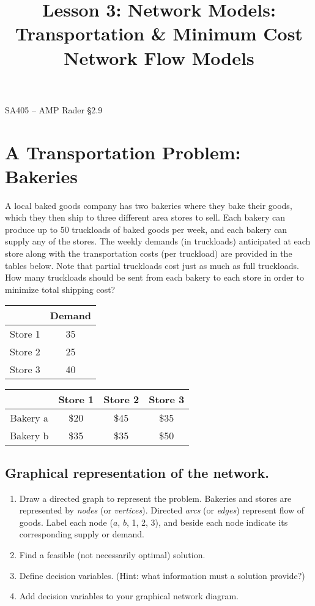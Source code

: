 \documentclass[11pt]{article}
\makeatletter
\theoremstyle{definition}
\renewcommand{\maketitle}{
  \noindent SA405 -- AMP \hfill Rader \S 2.9 \\

  \begin{center}\Large{\textbf{\@title}}\end{center}
}
\makeatother
\begin{document}
  
\title{Lesson 3: Network Models: Transportation \& Minimum Cost Network Flow Models}


\maketitle
\bigskip
\vspace{-1cm}

\section{A Transportation Problem:  Bakeries}
A local baked goods company has two bakeries where they bake their goods, which they then ship to three different area stores to sell.  Each bakery can produce up to 50 truckloads of baked goods per week, and each bakery can supply any of the stores.  The weekly demands (in truckloads) anticipated at each store along with the transportation costs (per truckload) are provided in the tables below.  Note that partial truckloads cost just as much as full truckloads.  How many truckloads should be sent from each bakery to each store in order to minimize total shipping cost?
\begin{center}
\begin{tabular}{|c|c|}
\hline
 & Demand \\
\hline
Store 1 & 35 \\
\hline
Store 2 & 25 \\
\hline
Store 3 & 40 \\
\hline
\end{tabular}
\hspace{1cm}
\begin{tabular}{|c|c|c|c|}
\hline
& Store 1 & Store 2 & Store 3 \\
\hline
Bakery a & \$20 & \$45 & \$35 \\
\hline
Bakery b & \$35 & \$35 & \$50 \\
\hline
\end{tabular}
\end{center}


\subsection{Graphical representation of the network.}
\begin{enumerate}
\item  Draw a directed graph to represent the problem.  Bakeries and stores are represented by \emph{nodes} (or \emph{vertices}).  Directed \emph{arcs} (or \emph{edges}) represent flow of goods. Label each node ($a$, $b$, 1, 2, 3), and beside each node indicate its corresponding supply or demand. \newpage
\item  Find a feasible (not necessarily optimal) solution.   
\vspace{2in}
\item  Define decision variables.  (Hint:  what information must a solution provide?) 
\vspace{2in}
\item  Add decision variables to your graphical network diagram. \newpage
\end{enumerate}
\end{document}
